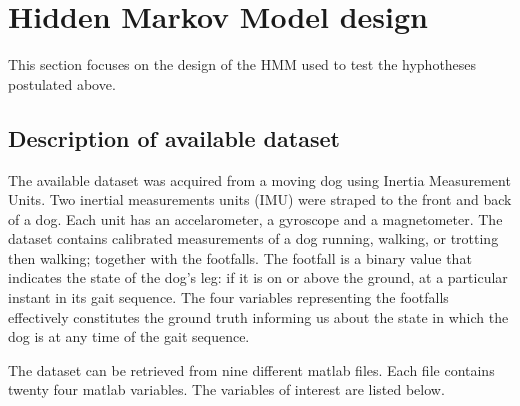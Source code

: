 \chapter{Hidden Markov Model design}






This section focuses on the design of the HMM used to test the hyphotheses postulated above.

\section{Description of available dataset}

The available dataset was acquired from a moving dog using Inertia Measurement Units. 
Two inertial measurements units (IMU) were straped to the front and back of a dog. Each unit has an accelarometer, a gyroscope and a magnetometer. The dataset contains calibrated measurements of a dog running, walking, or trotting then walking; together with the footfalls. The footfall is a binary value that indicates the state of the dog's leg: if it is on or above the ground, at a particular instant in its gait sequence. 
The four variables representing the footfalls effectively constitutes the ground truth informing us about the state in which the dog is at any time of the gait sequence.

The dataset can be retrieved from nine different matlab files. Each file contains twenty four matlab variables. The variables of interest are listed below. 

